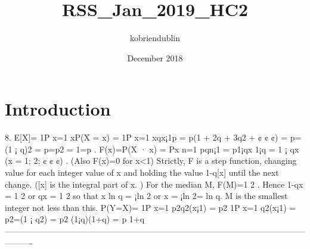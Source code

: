 \documentclass{article}
\title{RSS_Jan_2019_HC2}
\author{kobriendublin }
\date{December 2018}
\begin{document}
\section{Introduction}

8.
E[X]=
1P
x=1
xP(X = x) =
1P
x=1
xqx¡1p = p(1 + 2q + 3q2 + ¢ ¢ ¢)
= p=(1 ¡ q)2 = p=p2 = 1=p .
F(x)=P(X · x) =
Px
n=1
pqn¡1 = p1¡qx
1¡q = 1 ¡ qx (x = 1; 2; ¢ ¢ ¢) .
(Also F(x)=0 for x<1)
Strictly, F is a step function, changing value for each integer value of x and holding the value
1-q[x] until the next change. ([x] is the integral part of x. )
For the median M, F(M)=1
2 .
Hence 1-qx = 1
2 or qx = 1
2 so that x ln q = ¡ln 2 or x = ¡ln 2= ln q. M is the smallest integer not
less than this.
P(Y=X)=
1P
x=1
p2q2(x¡1) = p2
1P
x=1
q2(x¡1) = p2=(1 ¡ q2) = p2
(1¡q)(1+q) = p
1+q
———————————————————————————————————————-
\end{document}
